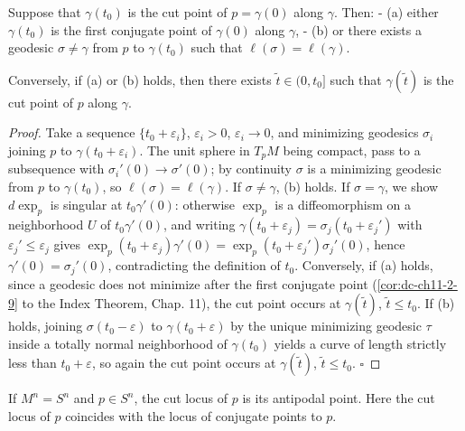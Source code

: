 \begin{proposition}
  \label{prop:dc-ch13-2-2}
  Suppose that $\gamma(t_0)$ is the cut point of $p=\gamma(0)$ along $\gamma$. Then:
  - (a) either $\gamma(t_0)$ is the first conjugate point of $\gamma(0)$ along
    $\gamma$,
  - (b) or there exists a geodesic $\sigma\neq\gamma$ from $p$ to $\gamma(t_0)$ such
    that $\ell(\sigma)=\ell(\gamma)$.
  
  Conversely, if (a) or (b) holds, then there exists $\tilde t\in(0,t_0]$ such that
  $\gamma(\tilde t)$ is the cut point of $p$ along $\gamma$.
\end{proposition}
\begin{proof}
  Take a sequence $\{t_0+\varepsilon_i\}$, $\varepsilon_i>0$,
  $\varepsilon_i\to 0$, and minimizing geodesics $\sigma_i$ joining $p$ to
  $\gamma(t_0+\varepsilon_i)$. The unit sphere in $T_pM$ being compact, pass to a
  subsequence with $\sigma_i'(0)\to\sigma'(0)$; by continuity $\sigma$ is a
  minimizing geodesic from $p$ to $\gamma(t_0)$, so $\ell(\sigma)=\ell(\gamma)$. If
  $\sigma\neq\gamma$, (b) holds. If $\sigma=\gamma$, we show $d\exp_p$ is singular at
  $t_0\gamma'(0)$: otherwise $\exp_p$ is a diffeomorphism on a neighborhood $U$ of
  $t_0\gamma'(0)$, and writing $\gamma(t_0+\varepsilon_j)=\sigma_j(t_0+\varepsilon_j')$
  with $\varepsilon_j'\leq\varepsilon_j$ gives
  $\exp_p(t_0+\varepsilon_j)\gamma'(0)=\exp_p(t_0+\varepsilon_j')\sigma_j'(0)$, hence
  $\gamma'(0)=\sigma_j'(0)$, contradicting the definition of $t_0$. Conversely, if
  (a) holds, since a geodesic does not minimize after the first conjugate point
  (\cref{cor:dc-ch11-2-9} to the Index Theorem, Chap. 11), the cut point occurs at
  $\gamma(\tilde t)$, $\tilde t\leq t_0$. If (b) holds, joining $\sigma(t_0-\varepsilon)$
  to $\gamma(t_0+\varepsilon)$ by the unique minimizing geodesic $\tau$ inside a
  totally normal neighborhood of $\gamma(t_0)$ yields a curve of length strictly less
  than $t_0+\varepsilon$, so again the cut point occurs at $\gamma(\tilde t)$,
  $\tilde t\leq t_0$. $\square$
\end{proof}

\begin{example}
  \label{ex:dc-ch13-2-3}
  If $M^n=S^n$ and $p\in S^n$, the cut locus of $p$ is its antipodal point. Here the
  cut locus of $p$ coincides with the locus of conjugate points to $p$.
\end{example}

